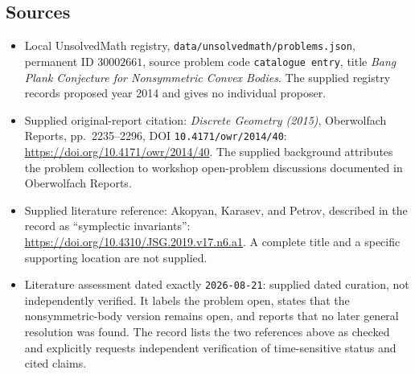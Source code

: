 \documentclass[11pt]{article}
\begin{document}
\subsection{Sources}
\begin{itemize}
\item Local UnsolvedMath registry, \texttt{data/unsolvedmath/problems.json}, permanent ID \(30002661\), source problem code \texttt{catalogue entry}, title \emph{Bang Plank Conjecture for Nonsymmetric Convex Bodies}. The supplied registry records proposed year 2014 and gives no individual proposer.
\item Supplied original-report citation: \emph{Discrete Geometry (2015)}, Oberwolfach Reports, pp.\ 2235--2296, DOI \texttt{10.4171/owr/2014/40}: \url{https://doi.org/10.4171/owr/2014/40}. The supplied background attributes the problem collection to workshop open-problem discussions documented in Oberwolfach Reports.
\item Supplied literature reference: Akopyan, Karasev, and Petrov, described in the record as ``symplectic invariants'': \url{https://doi.org/10.4310/JSG.2019.v17.n6.a1}. A complete title and a specific supporting location are not supplied.
\item Literature assessment dated exactly \texttt{2026-08-21}: supplied dated curation, not independently verified. It labels the problem open, states that the nonsymmetric-body version remains open, and reports that no later general resolution was found. The record lists the two references above as checked and explicitly requests independent verification of time-sensitive status and cited claims.
\end{itemize}
\end{document}
